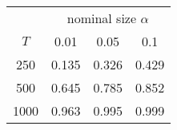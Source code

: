 % 
\begin{tabular}{cccc}
  \hline
  & \multicolumn{3}{c}{nominal size $\alpha$} \\
 $T$ & 0.01 & 0.05 & 0.1 \\
 \hline
250 & 0.135 & 0.326 & 0.429 \\ 
  500 & 0.645 & 0.785 & 0.852 \\ 
  1000 & 0.963 & 0.995 & 0.999 \\ 
   \hline
\end{tabular}
